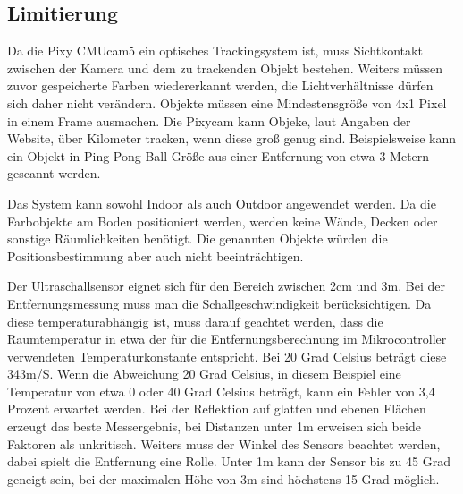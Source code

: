   \subsection*{Limitierung}
  Da die Pixy CMUcam5\cite{Pixy} ein optisches Trackingsystem ist, muss Sichtkontakt zwischen der Kamera und dem zu trackenden Objekt bestehen. Weiters müssen zuvor gespeicherte Farben wiedererkannt werden, die Lichtverhältnisse dürfen sich daher nicht verändern.
  Objekte müssen eine Mindestensgröße von 4x1 Pixel in einem Frame ausmachen. Die Pixycam kann Objeke, laut Angaben der Website, über Kilometer tracken, wenn diese groß genug sind. Beispielsweise kann ein Objekt in Ping-Pong Ball Größe aus einer Entfernung von etwa 3 Metern gescannt werden. 

  Das System kann sowohl Indoor als auch Outdoor angewendet werden. Da die Farbobjekte am Boden positioniert werden, werden keine Wände, Decken oder sonstige Räumlichkeiten benötigt. Die genannten Objekte würden die Positionsbestimmung aber auch nicht beeinträchtigen.

  Der Ultraschallsensor eignet sich für den Bereich zwischen 2cm und 3m. Bei der Entfernungsmessung muss man die Schallgeschwindigkeit berücksichtigen. Da diese temperaturabhängig \cite{Ultrasonic} ist, muss darauf geachtet werden, dass die Raumtemperatur in etwa der für die Entfernungsberechnung im Mikrocontroller verwendeten Temperaturkonstante entspricht. Bei 20 Grad Celsius beträgt diese 343m/S. Wenn die Abweichung 20 Grad Celsius, in diesem Beispiel eine Temperatur von etwa 0 oder 40 Grad Celsius beträgt, kann ein Fehler von 3,4 Prozent erwartet werden.
  Bei der Reflektion auf glatten und ebenen Flächen erzeugt das beste Messergebnis, bei Distanzen unter 1m erweisen sich beide Faktoren als unkritisch.
  Weiters muss der Winkel des Sensors beachtet werden, dabei spielt die Entfernung eine Rolle. Unter 1m kann der Sensor bis zu 45 Grad geneigt sein, bei der maximalen Höhe von 3m sind höchstens 15 Grad möglich.
